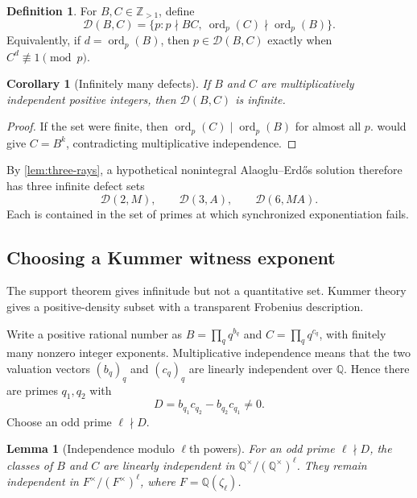 \documentclass[11pt]{article}
\newtheorem{lemma}[theorem]{Lemma}
\newtheorem{corollary}[theorem]{Corollary}
\theoremstyle{definition}
\newtheorem{definition}[theorem]{Definition}
\newcommand{\Z}{\mathbb Z}
\newcommand{\Q}{\mathbb Q}
\newcommand{\ord}{\operatorname{ord}}
\newcommand{\Def}{\mathcal D}
\newcommand{\AEname}{Alaoglu--Erd\H{o}s}
\begin{document}
\begin{definition}
For $B,C\in\Z_{>1}$, define
\begin{equation}
 \Def(B,C)=
 \{p:p\nmid BC,\ \ord_p(C)\nmid\ord_p(B)\}.
 \label{eq:defect-set}
\end{equation}
Equivalently, if $d=\ord_p(B)$, then $p\in\Def(B,C)$ exactly when
$C^d\not\equiv1\pmod p$.
\end{definition}

\begin{corollary}[Infinitely many defects]
\label{cor:infinite-defects}
If $B$ and $C$ are multiplicatively independent positive integers, then $\Def(B,C)$ is
infinite.
\end{corollary}

\begin{proof}
If the set were finite, then $\ord_p(C)\mid\ord_p(B)$ for almost all $p$.
 would give $C=B^k$, contradicting multiplicative independence.
\end{proof}

By \cref{lem:three-rays}, a hypothetical nonintegral \AEname{} solution therefore has three
infinite defect sets
\begin{equation}
 \Def(2,M),\qquad \Def(3,A),\qquad \Def(6,MA).
 \label{eq:three-defect-sets}
\end{equation}
Each is contained in the set of primes at which synchronized exponentiation fails.

\subsection{Choosing a Kummer witness exponent}

The support theorem gives infinitude but not a quantitative set.  Kummer theory gives a
positive-density subset with a transparent Frobenius description.

Write a positive rational number as
$B=\prod_q q^{b_q}$ and $C=\prod_q q^{c_q}$, with finitely many nonzero integer exponents.
Multiplicative independence means that the two valuation vectors $(b_q)_q$ and $(c_q)_q$ are
linearly independent over $\Q$.  Hence there are primes $q_1,q_2$ with
\begin{equation}
 D=b_{q_1}c_{q_2}-b_{q_2}c_{q_1}\ne0.
 \label{eq:minor-D}
\end{equation}
Choose an odd prime $\ell\nmid D$.

\begin{lemma}[Independence modulo $\ell$th powers]
\label{lem:kummer-independence}
For an odd prime $\ell\nmid D$, the classes of $B$ and $C$ are linearly independent in
$\Q^\times/(\Q^\times)^\ell$.  They remain independent in
$F^\times/(F^\times)^\ell$, where $F=\Q(\zeta_\ell)$.
\end{lemma}
\end{document}
